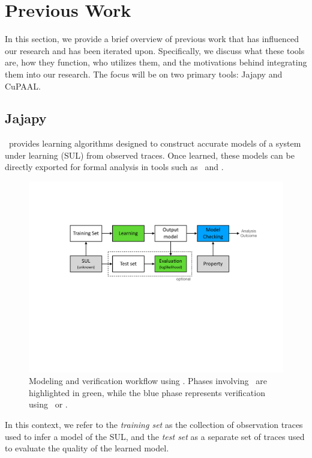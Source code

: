 \section{Previous Work}\label{sec:jajapy_and_cupaal}
In this section, we provide a brief overview of previous work that has influenced our research and has been iterated upon.
Specifically, we discuss what these tools are, how they function, who utilizes them, and the motivations behind integrating them into our research.
The focus will be on two primary tools: Jajapy and CuPAAL.


\subsection{Jajapy}\label{sec:jajapy}
\Jajapy\ provides learning algorithms designed to construct accurate models of a system under learning (SUL) from observed traces.
Once learned, these models can be directly exported for formal analysis in tools such as \Storm~and \Prism.

\begin{figure}[!htb]
    \centering
    \includegraphics[width=1\columnwidth]{figures/workflow.pdf}
    \caption{Modeling and verification workflow using \Jajapy. Phases involving \Jajapy\ are highlighted in green, while the blue phase represents verification using \Storm~or \Prism.}
    \label{fig:workflow}
\end{figure}

In this context, we refer to the \textit{training set} as the collection of observation traces used to infer a model of the SUL, and the \textit{test set} as a separate set of traces used to evaluate the quality of the learned model.

